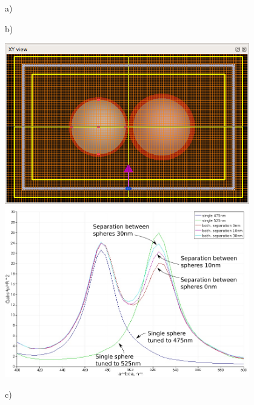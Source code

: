 \documentclass[a4paper]{article}
\begin{document}
\begin{figure}
  \begin{minipage}[h]{0.49\textwidth}    \begin{flushleft}     a)    \end{flushleft}
  \end{minipage}
  \begin{minipage}[h]{0.49\textwidth}    \begin{flushleft}     b)    \end{flushleft}
  \end{minipage}
  \begin{minipage}[h]{0.49\textwidth} 
   \includegraphics[width=0.95\textwidth]{FDTD-mode-d00}
  \end{minipage}
  \begin{minipage}[h]{0.49\textwidth} 
   \includegraphics[width=0.95\textwidth]{fdtd-spectra}
  \end{minipage}
  \begin{minipage}[h]{0.49\textwidth}    \begin{flushleft}     c)    \end{flushleft}

\end{minipage}
\end{figure}
\end{document}
